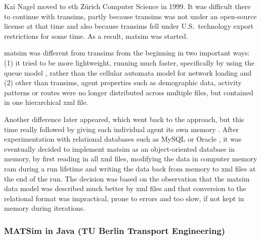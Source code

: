 Kai Nagel moved to \gls{eth} Zürich Computer Science in 1999.  It was difficult there to continue with \gls{transims}, partly because \gls{transims} was not under an open-source license at that time and also because \gls{transims} fell under U.S.\ technology export restrictions for some time.  As a result, \gls{matsim} was started.

\gls{matsim} was different from  \gls{transims} from the beginning in two important ways: (1) it tried to be more lightweight, \ie running much faster, specifically by using the queue model \citep{Gawron_IJMPC_1998}, rather than the cellular automata model for network loading and (2) other than \gls{transims}, agent properties such as demographic data, activity patterns or routes were no longer distributed across multiple files, but contained in one hierarchical \gls{xml} file.

Another difference later appeared, which went back to the \citet{Nagel1996NRW} approach, but this time really followed \citet{ArthurBar} by giving each individual agent its own memory \citep{RaneyNagel2006traf-framework}.  After experimentation with relational databases such as MySQL \citep{mysql-wikipedia} or Oracle \citep{oracle}, it was eventually decided to implement \gls{matsim} as an object-oriented database in memory, \ie by first reading in all \gls{xml} files, modifying the data in computer memory \gls{ram} during a run lifetime and writing the data back from memory to \gls{xml} files at the end of the run.  The decision was based on the observation that the \gls{matsim} data model was described much better by \gls{xml} files and that conversion to the relational format was impractical, prone to errors and too slow, if not kept in memory during iterations. 

\subsubsection{MATSim in Java (TU Berlin Transport Engineering)}
\label{sec:matsim-in-java}

